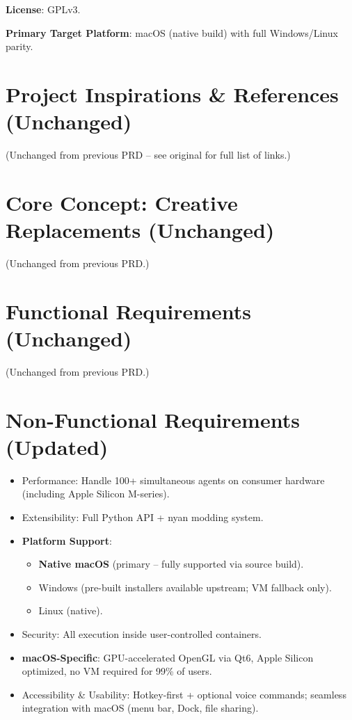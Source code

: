 \documentclass[11pt,a4paper]{article}
\begin{document}
\textbf{License}: GPLv3.

\textbf{Primary Target Platform}: macOS (native build) with full Windows/Linux parity.

\newpage
\section{Project Inspirations \& References (Unchanged)}

(Unchanged from previous PRD – see original for full list of links.)

\section{Core Concept: Creative Replacements (Unchanged)}

(Unchanged from previous PRD.)

\section{Functional Requirements (Unchanged)}

(Unchanged from previous PRD.)

\section{Non-Functional Requirements (Updated)}

\begin{itemize}
    \item Performance: Handle 100+ simultaneous agents on consumer hardware (including Apple Silicon M-series).
    \item Extensibility: Full Python API + nyan modding system.
    \item \textbf{Platform Support}: 
        \begin{itemize}
            \item \textbf{Native macOS} (primary – fully supported via source build).
            \item Windows (pre-built installers available upstream; VM fallback only).
            \item Linux (native).
        \end{itemize}
    \item Security: All execution inside user-controlled containers.
    \item \textbf{macOS-Specific}: GPU-accelerated OpenGL via Qt6, Apple Silicon optimized, no VM required for 99\% of users.
    \item Accessibility \& Usability: Hotkey-first + optional voice commands; seamless integration with macOS (menu bar, Dock, file sharing).
\end{itemize}
\end{document}
